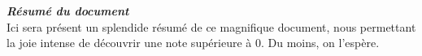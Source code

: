 \thispagestyle{empty}
\vspace*{10mm}

\textbf{\emph{\textcolor{epiBlue}{\large{Résumé du document} } } }\\

Ici sera présent un splendide résumé de ce magnifique document, nous permettant la joie intense de découvrir une note supérieure à 0. Du moins, on l'espère.

\clearpage
